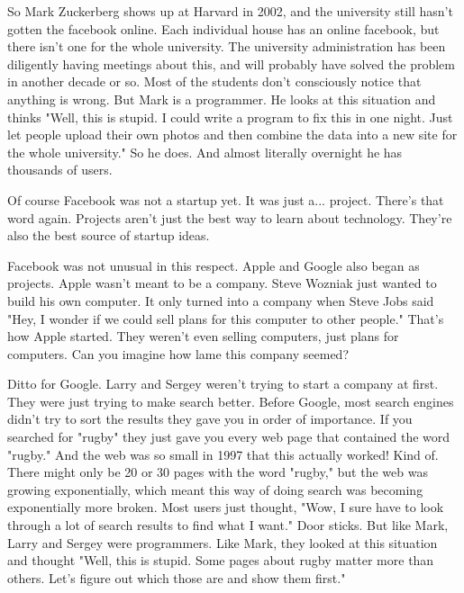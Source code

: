 So Mark
                  Zuckerberg shows up at Harvard in 2002, and the university
                  still hasn't gotten the facebook online. Each individual house
                  has an online facebook, but there isn't one for the whole
                  university. The university administration has been diligently
                  having meetings about this, and will probably have solved the
                  problem in another decade or so. Most of the students don't
                  consciously notice that anything is wrong. But Mark is a
                  programmer. He looks at this situation and thinks "Well, this
                  is stupid. I could write a program to fix this in one night.
                  Just let people upload their own photos and then combine the
                  data into a new site for the whole university." So he does.
                  And almost literally overnight he has thousands of users.

Of
                  course Facebook was not a startup yet. It was just a...
                  project. There's that word again. Projects aren't just the
                  best way to learn about technology. They're also the best
                  source of startup ideas.

Facebook was not unusual
                  in this respect. Apple and Google also began as projects.
                  Apple wasn't meant to be a company. Steve Wozniak just wanted
                  to build his own computer. It only turned into a company when
                  Steve Jobs said "Hey, I wonder if we could sell plans for this
                  computer to other people." That's how Apple started. They
                  weren't even selling computers, just plans for computers. Can
                  you imagine how lame this company seemed?

Ditto for
                  Google. Larry and Sergey weren't trying to start a company at
                  first. They were just trying to make search better. Before
                  Google, most search engines didn't try to sort the results
                  they gave you in order of importance. If you searched for
                  "rugby" they just gave you every web page that contained the
                  word "rugby." And the web was so small in 1997 that this
                  actually worked! Kind of. There might only be 20 or 30 pages
                  with the word "rugby," but the web was growing exponentially,
                  which meant this way of doing search was becoming
                  exponentially more broken. Most users just thought, "Wow, I
                  sure have to look through a lot of search results to find what
                  I want." Door sticks. But like Mark, Larry and Sergey were
                  programmers. Like Mark, they looked at this situation and
                  thought "Well, this is stupid. Some pages about rugby matter
                  more than others. Let's figure out which those are and show
                  them first."

